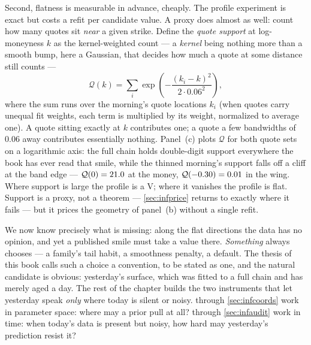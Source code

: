 Second, flatness is measurable in advance, cheaply.  The profile
experiment is exact but costs a refit per candidate value.  A proxy
does almost as well: count how many quotes sit \emph{near} a given
strike.  Define the \emph{quote support} at log-moneyness $k$ as
the kernel-weighted count --- a \emph{kernel} being nothing more
than a smooth bump, here a Gaussian, that decides how much a quote
at some distance still counts ---
\begin{equation}
\mathcal{Q}(k)
=\sum_{i}\exp\!\left(-\frac{(k_i-k)^2}{2\cdot0.06^2}\right),
\label{eq:infsupport}
\end{equation}
where the sum runs over the morning's quote locations $k_i$ (when
quotes carry unequal fit weights, each term is multiplied by its
weight, normalized to average one).  A quote sitting exactly at $k$
contributes one; a quote a few bandwidths of $0.06$ away contributes
essentially nothing.  Panel~(c) plots $\mathcal{Q}$ for both quote
sets on a logarithmic axis: the full chain holds double-digit
support everywhere the book has ever read that smile, while the
thinned morning's support falls off a cliff at the band edge ---
$\mathcal{Q}(0)=21.0$ at the money,
$\mathcal{Q}(-0.30)=0.01$ in the wing.  Where
support is large the profile is a V; where it vanishes the profile
is flat.  Support is a proxy, not a theorem --- \cref{sec:infprice}
returns to exactly where it fails --- but it prices the geometry of
panel~(b) without a single refit.

We now know precisely what is missing: along the flat directions
the data has no opinion, and yet a published smile must take a
value there.  \emph{Something} always chooses --- a family's tail
habit, a smoothness penalty, a default.  The thesis of this book
calls such a choice a convention, to be stated as one, and the
natural candidate is obvious: yesterday's surface, which was
fitted to a full chain and has merely aged a day.  The rest of the
chapter builds the two instruments that let yesterday speak
\emph{only} where today is silent or noisy.  
through \cref{sec:infcoords} work in parameter space: where may a
prior pull at all?   through \cref{sec:infaudit}
work in time: when today's data is present but noisy, how hard may
yesterday's prediction resist it?
